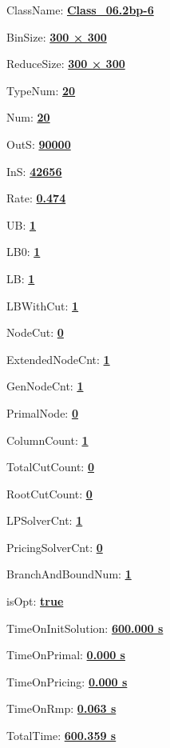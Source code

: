 \documentclass[11pt]{article}
\begin{document}
\pagestyle{empty}


ClassName: \underline{\textbf{Class_06.2bp-6}}
\par
BinSize: \underline{\textbf{300 × 300}}
\par
ReduceSize: \underline{\textbf{300 × 300}}
\par
TypeNum: \underline{\textbf{20}}
\par
Num: \underline{\textbf{20}}
\par
OutS: \underline{\textbf{90000}}
\par
InS: \underline{\textbf{42656}}
\par
Rate: \underline{\textbf{0.474}}
\par
UB: \underline{\textbf{1}}
\par
LB0: \underline{\textbf{1}}
\par
LB: \underline{\textbf{1}}
\par
LBWithCut: \underline{\textbf{1}}
\par
NodeCut: \underline{\textbf{0}}
\par
ExtendedNodeCnt: \underline{\textbf{1}}
\par
GenNodeCnt: \underline{\textbf{1}}
\par
PrimalNode: \underline{\textbf{0}}
\par
ColumnCount: \underline{\textbf{1}}
\par
TotalCutCount: \underline{\textbf{0}}
\par
RootCutCount: \underline{\textbf{0}}
\par
LPSolverCnt: \underline{\textbf{1}}
\par
PricingSolverCnt: \underline{\textbf{0}}
\par
BranchAndBoundNum: \underline{\textbf{1}}
\par
isOpt: \underline{\textbf{true}}
\par
TimeOnInitSolution: \underline{\textbf{600.000 s}}
\par
TimeOnPrimal: \underline{\textbf{0.000 s}}
\par
TimeOnPricing: \underline{\textbf{0.000 s}}
\par
TimeOnRmp: \underline{\textbf{0.063 s}}
\par
TotalTime: \underline{\textbf{600.359 s}}
\par
\newpage
\end{document}
